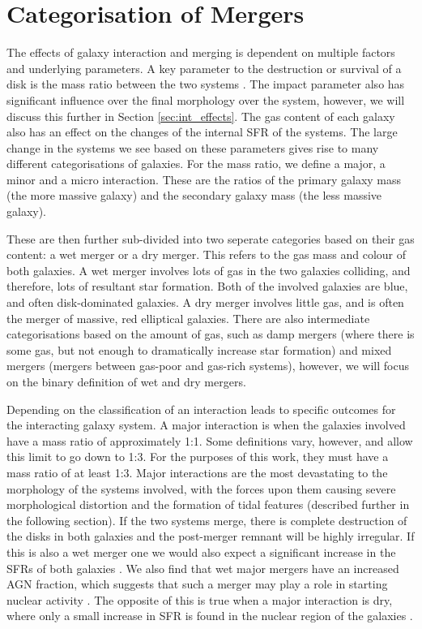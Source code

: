 \section{Categorisation of Mergers}
\noindent The effects of galaxy interaction and merging is dependent on multiple factors and underlying parameters. A key parameter to the destruction or survival of a disk is the mass ratio between the two systems \citep{2005A&A...437...69B, 2008MNRAS.384..386C}. The impact parameter also has significant influence over the final morphology over the system, however, we will discuss this further in Section \ref{sec:int_effects}. The gas content of each galaxy also has an effect on the changes of the internal SFR of the systems. The large change in the systems we see based on these parameters gives rise to many different categorisations of galaxies. For the mass ratio, we define a major, a minor and a micro interaction. These are the ratios of the primary galaxy mass (the more massive galaxy) and the secondary galaxy mass (the less massive galaxy). 

These are then further sub-divided into two seperate categories based on their gas content: a wet merger or a dry merger. This refers to the gas mass and colour of both galaxies. A wet merger involves lots of gas in the two galaxies colliding, and therefore, lots of resultant star formation. Both of the involved galaxies are blue, and often disk-dominated galaxies. A dry merger involves little gas, and is often the merger of massive, red elliptical galaxies. There are also intermediate categorisations based on the amount of gas, such as damp mergers (where there is some gas, but not enough to dramatically increase star formation) and mixed mergers (mergers between gas-poor and gas-rich systems), however, we will focus on the binary definition of wet and dry mergers.

Depending on the classification of an interaction leads to specific outcomes for the interacting galaxy system. A major interaction is when the galaxies involved have a mass ratio of approximately 1:1. Some definitions vary, however, and allow this limit to go down to 1:3. For the purposes of this work, they must have a mass ratio of at least 1:3. Major interactions are the most devastating to the morphology of the systems involved, with the forces upon them causing severe morphological distortion and the formation of tidal features (described further in the following section). If the two systems merge, there is complete destruction of the disks in both galaxies and the post-merger remnant will be highly irregular. If this is also a wet merger one we would also expect a significant increase in the SFRs of both galaxies \citep{1994ApJ...425L..13M, 1996ApJ...464..641M, 2006AJ....132..197W}. We also find that wet major mergers have an increased AGN fraction, which suggests that such a merger may play a role in starting nuclear activity \citep{2007MNRAS.375.1017A, 2011MNRAS.418.2043E, 2012ApJ...746L..22K}. The opposite of this is true when a major interaction is dry, where only a small increase in SFR is found in the nuclear region of the galaxies \citep{2004ApJ...614..586S, 2006ApJ...640..241B}.


